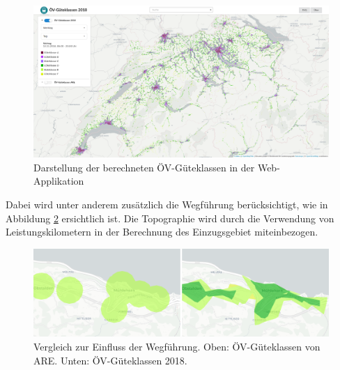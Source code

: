 \begin{figure}[ht]
    \centering
    \includegraphics[width=1\linewidth]{technicalreport/img/resultat_oevgk18_uebersicht}
    \caption[Darstellung der berechneten ÖV-Güteklassen in der Web-Applikation]{Darstellung der berechneten ÖV-Güteklassen in der Web-Applikation}
    \label{fig:mntg_sum_resultat_webapp_uebersicht}
\end{figure}

Dabei wird unter anderem zusätzlich die Wegführung berücksichtigt, wie in Abbildung \ref{fig:mgmt_summary_vergleich_wegfuehrung} ersichtlich ist.
Die Topographie wird durch die Verwendung von Leistungskilometern in der Berechnung des Einzugsgebiet miteinbezogen.

\begin{figure}[ht]
    \centering
    \includegraphics[width=0.8\linewidth]{start/img/vergleich_wegfuehrung}
    \caption[Vergleich zur Einfluss der Wegführung]{Vergleich zur Einfluss der Wegführung. Oben: ÖV-Güteklassen von \ac{ARE}. Unten: ÖV-Güteklassen 2018.}
    \label{fig:mgmt_summary_vergleich_wegfuehrung}
\end{figure}


